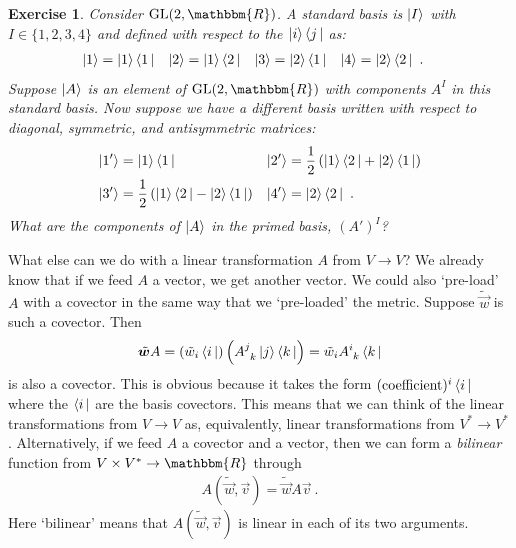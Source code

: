 \documentclass[
  11pt,
	colorful,
	raggedright,
]{tufte-style-thesis-flip}
\newtheorem{exercise}{Exercise}[section]
\newcommand{\aij}[2]{^{#1}_{\phantom{#1}#2}}
\begin{document}
\begin{exercise}
Consider $\text{GL}(2,\mathbbm{R})$. A standard basis is $\left|I\right\rangle$ with $I\in\{1,2,3,4\}$ and defined with respect to the $\left|i\right\rangle\left\langle j\,\right|$ as:
\begin{align}
  \left|1\right\rangle &= \left|1\right\rangle\left\langle1\,\right|
  &
  \left|2\right\rangle &= \left|1\right\rangle\left\langle2\,\right|
  &
  \left|3\right\rangle &= \left|2\right\rangle\left\langle1\,\right|
  &
  \left|4\right\rangle &= \left|2\right\rangle\left\langle2\,\right| \ .
\end{align}
Suppose $\left|A\right\rangle$ is an element of $\text{GL}(2,\mathbbm{R})$ with components $A^I$ in this standard basis. Now suppose we have a different basis written with respect to diagonal, symmetric, and antisymmetric matrices:
\begin{align}
  \left|1'\right\rangle &= \left|1\right\rangle\left\langle1\,\right|
  &
  \left|2'\right\rangle &= \frac{1}{2}\left(\left|1\right\rangle\left\langle2\,\right|+\left|2\right\rangle\left\langle1\,\right|\right)
  \\
  \left|3'\right\rangle &= \frac{1}{2}\left(\left|1\right\rangle\left\langle2\,\right|-\left|2\right\rangle\left\langle1\,\right|\right)
  &
  \left|4'\right\rangle &= \left|2\right\rangle\left\langle2\,\right| \ .
\end{align}
What are the components of $\left|A\right\rangle$ in the primed basis, $(A')^I$?
\end{exercise}

What else can we do with a linear transformation $A$ from $V\to V$? We already know that if we feed $A$ a vector, we get another vector. We could also `pre-load' $A$ with a covector in the same way that we `pre-loaded' the metric. Suppose $\tilde{\vec{w}}$ is such a covector. Then
\begin{align}
  \tilde{\vec{w}}A = 
  \left(\tilde{w}_i\bra{i}\right)
  \left(A\aij{j}{k}\ket{j}\bra{k}\right)
  =
  \tilde{w}_iA\aij{i}{k} \bra{k}
  \label{eq:row:acting:on:tensor}
\end{align}
is also a covector. This is obvious because it takes the form $(\textnormal{coefficient})^i\left\langle i\,\right|$ where the $\left\langle i\,\right|$ are the basis covectors. 
This means that we can think of the linear transformations from $V\to V$ as, equivalently, linear transformations from $V^* \to V^*$. Alternatively, if we feed $A$ a covector and a vector, then we can form a \emph{bilinear} function from $V\times V^* \to \mathbbm{R}$ through
\begin{align}
  A(\tilde{\vec{w}}, \vec{v}) = \tilde{\vec{w}} A \vec{v} \ .
\end{align}
Here `bilinear' means that $A(\tilde{\vec{w}}, \vec{v})$ is linear in each of its two arguments. 
\end{document}
